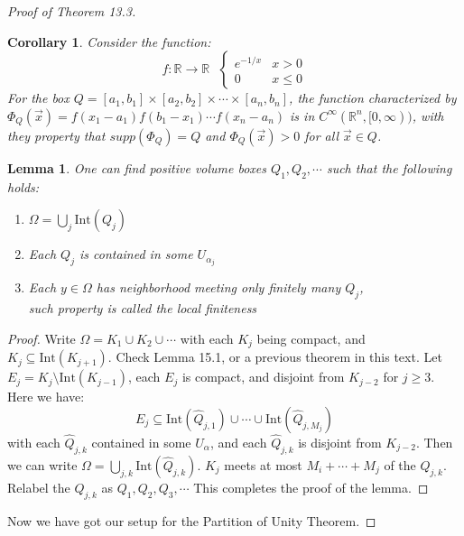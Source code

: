 \documentclass[15pt]{book}
\theoremstyle{break}
\theoremstyle{break}
\newtheorem{lem}{Lemma}[thm]
\newtheorem{corL}{Corollary}[lem]
\newcommand{\R}{\mathbb{R}}
\newcommand{\Int}{\text{Int}}
\begin{document}
\begin{proof}[Proof of Theorem 13.3]
\begin{corL}
\setlength{\leftskip}{1cm}Consider the function: 
$$f:\R \to \R \ \ \ \begin{cases}e^{-1/x} &x>0\\0&x\leq 0  \end{cases}$$
For the box $Q = [a_1,b_1]\times [a_2,b_2] \times \cdots \times [a_n,b_n]$, the function characterized by $\Phi_Q(\vec{x}) = f(x_1-a_1)f(b_1-x_1)\cdots f(x_n-a_n)$ is in $C^\infty(\R^n,[0,\infty))$, with they property that $supp(\Phi_Q) = Q$ and $\Phi_Q (\vec{x})> 0$ for all $\vec{x}\in Q$. 
\end{corL}


\begin{lem}
\setlength{\leftskip}{1cm}One can find positive volume boxes $Q_1,Q_2,\cdots$ such that the following holds:
\begin{enumerate}[topsep=3pt,itemsep=-1ex,partopsep=1ex,parsep=1ex,leftmargin=1.5cm]
\item $\Omega = \bigcup_j \Int(Q_j)$
\item Each $Q_j$ is contained in some $U_{\alpha_j}$
\item Each $y \in \Omega$ has neighborhood meeting only finitely many $Q_j$,\\ such property is called the local finiteness 
\end{enumerate} 
\end{lem}
\begin{proof}
\setlength{\leftskip}{1cm}Write $\Omega = K_1 \cup K_2\cup \cdots$ with each $K_j$ being compact, and $K_j \subseteq \Int(K_{j+1})$. Check Lemma 15.1, or a previous theorem in this text. Let $E_j = K_j \setminus \Int(K_{j-1})$, each $E_j$ is compact, and disjoint from $K_{j-2}$ for $j \geq 3$. Here we have:
$$E_j \subseteq \Int(\hat{Q}_{j,1}) \cup \cdots \cup \Int(\hat{Q}_{j,M_j})$$ 
with each $\hat{Q}_{j,k}$ contained in some $U_\alpha$, and each $\hat{Q}_{j,k}$ is disjoint from $K_{j-2}$. Then we can write $\Omega = \bigcup_{j,k} \Int(\hat{Q}_{j,k})$. $K_j$ meets at most $M_{i} + \cdots + M_j$ of the $\hat{Q}_{j,k}$. Relabel the $\hat{Q}_{j,k}$ as $Q_1,Q_2,Q_3,\cdots$ This completes the proof of the lemma. 
\end{proof}

Now we have got our setup for the Partition of Unity Theorem.


\end{proof}
\end{document}
